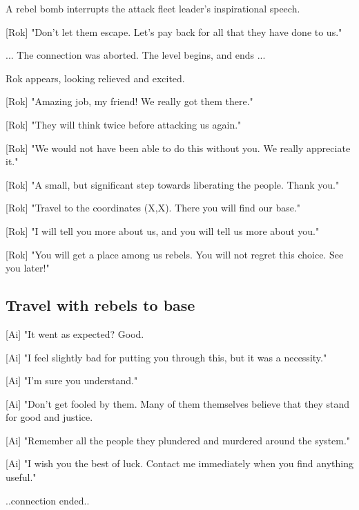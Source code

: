 \documentclass[a4paper,12pt]{article}
\begin{document}
A rebel bomb interrupts the attack fleet leader's inspirational speech.

[Rok] "Don't let them escape. Let's pay back for all that they have done to us."

... The connection was aborted. The level begins, and ends ...

Rok appears, looking relieved and excited.

[Rok] "Amazing job, my friend! We really got them there." 

[Rok] "They will think twice before attacking us again."

[Rok] "We would not have been able to do this without you. We really appreciate it."

[Rok] "A small, but significant step towards liberating the people. Thank you."

[Rok] "Travel to the coordinates (X,X). There you will find our base." 

[Rok] "I will tell you more about us, and you will tell us more about you." 

[Rok] "You will get a place among us rebels. You will not regret this choice. See you later!"

\subsection{Travel with rebels to base}

[Ai] "It went as expected? Good. 

[Ai] "I feel slightly bad for putting you through this, but it was a necessity." 

[Ai] "I'm sure you understand."

[Ai] "Don't get fooled by them. Many of them themselves believe that they
stand for good and justice.

[Ai] "Remember all the people they plundered and murdered around the system."

[Ai] "I wish you the best of luck. Contact me immediately when you find anything useful."

..connection ended..
\end{document}

